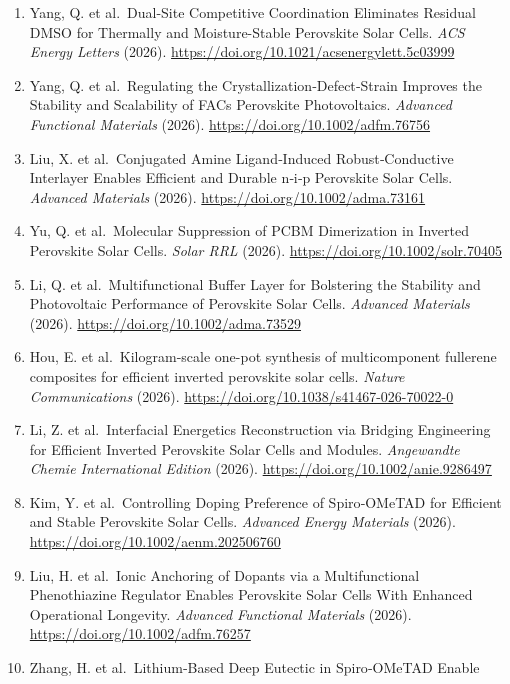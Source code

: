 \documentclass[
  11pt,
]{article}
\begin{document}
\begin{enumerate}
  Degradation Pathway of Perovskites. \emph{Advanced Materials} (2026).
  \url{https://doi.org/10.1002/adma.202520432}
\item
  Yang, Q. et al.~Dual-Site Competitive Coordination Eliminates Residual
  DMSO for Thermally and Moisture-Stable Perovskite Solar Cells.
  \emph{ACS Energy Letters} (2026).
  \url{https://doi.org/10.1021/acsenergylett.5c03999}
\item
  Yang, Q. et al.~Regulating the Crystallization‐Defect‐Strain Improves
  the Stability and Scalability of FACs Perovskite Photovoltaics.
  \emph{Advanced Functional Materials} (2026).
  \url{https://doi.org/10.1002/adfm.76756}
\item
  Liu, X. et al.~Conjugated Amine Ligand‐Induced Robust‐Conductive
  Interlayer Enables Efficient and Durable n‐i‐p Perovskite Solar Cells.
  \emph{Advanced Materials} (2026).
  \url{https://doi.org/10.1002/adma.73161}
\item
  Yu, Q. et al.~Molecular Suppression of PCBM Dimerization in Inverted
  Perovskite Solar Cells. \emph{Solar RRL} (2026).
  \url{https://doi.org/10.1002/solr.70405}
\item
  Li, Q. et al.~Multifunctional Buffer Layer for Bolstering the
  Stability and Photovoltaic Performance of Perovskite Solar Cells.
  \emph{Advanced Materials} (2026).
  \url{https://doi.org/10.1002/adma.73529}
\item
  Hou, E. et al.~Kilogram-scale one-pot synthesis of multicomponent
  fullerene composites for efficient inverted perovskite solar cells.
  \emph{Nature Communications} (2026).
  \url{https://doi.org/10.1038/s41467-026-70022-0}
\item
  Li, Z. et al.~Interfacial Energetics Reconstruction via Bridging
  Engineering for Efficient Inverted Perovskite Solar Cells and Modules.
  \emph{Angewandte Chemie International Edition} (2026).
  \url{https://doi.org/10.1002/anie.9286497}
\item
  Kim, Y. et al.~Controlling Doping Preference of Spiro‐OMeTAD for
  Efficient and Stable Perovskite Solar Cells. \emph{Advanced Energy
  Materials} (2026). \url{https://doi.org/10.1002/aenm.202506760}
\item
  Liu, H. et al.~Ionic Anchoring of Dopants via a Multifunctional
  Phenothiazine Regulator Enables Perovskite Solar Cells With Enhanced
  Operational Longevity. \emph{Advanced Functional Materials} (2026).
  \url{https://doi.org/10.1002/adfm.76257}
\item
  Zhang, H. et al.~Lithium‐Based Deep Eutectic in Spiro‐OMeTAD Enable

\end{enumerate}
\end{document}
